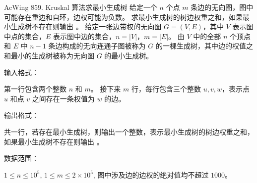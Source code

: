 \begin{titledbox}{AcWing 859. Kruskal 算法求最小生成树}
    给定一个 $n$ 个点 $m$ 条边的无向图，图中可能存在重边和自环，边权可能为负数。 求最小生成树的树边权重之和，如果最小生成树不存在则输出 。 给定一张边带权的无向图 $G=(V, E)$，其中 $V$ 表示图中点的集合，$E$ 表示图中边的集合，$n=|V|$，$m=|E|$。 由 $V$ 中的全部 $n$ 个顶点和 $E$ 中 $n-1$ 条边构成的无向连通子图被称为 $G$ 的一棵生成树，其中边的权值之和最小的生成树被称为无向图 $G$ 的最小生成树。

    输入格式：

    第一行包含两个整数 $n$ 和 $m$。 接下来 $m$ 行，每行包含三个整数 $u,v,w$，表示点 $u$ 和点 $v$ 之间存在一条权值为 $w$ 的边。

    输出格式：

    共一行，若存在最小生成树，则输出一个整数，表示最小生成树的树边权重之和，如果最小生成树不存在则输出 。

    数据范围：

    $1 \le n \le 10^5$, $1 \le m \le 2 \times 10^5$, 图中涉及边的边权的绝对值均不超过 $1000$。

    \begin{inputblock}
         \\
         \\
         \\
         \\
         \\
    \end{inputblock}
    \begin{outputblock}
    \end{outputblock}
\end{titledbox}

